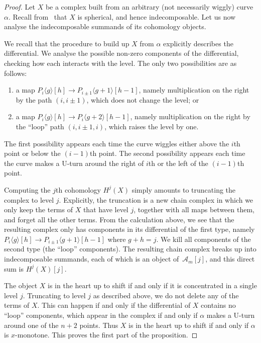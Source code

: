\documentclass{amsart}
\theoremstyle{definition}
\begin{document}
\begin{proof}
  Let \(X\) be a complex built from an arbitrary (not necessarily wiggly) curve \(\alpha\).
  Recall from~\cite{kho.sei:02} that \(X\) is spherical, and hence indecomposable.
  Let us now analyse the indecomposable summands of its cohomology objects.
  
  We recall that the procedure to build up \(X\) from \(\alpha\) explicitly describes the differential.
  We analyse the possible non-zero components of the differential, checking how each interacts with the level.
  The only two possibilities are as follows:
  \begin{enumerate}
  \item a map \(P_i\langle g \rangle[h] \to P_{i\pm1}\langle g+1 \rangle[h-1]\), namely multiplication on the right by the path \((i,i\pm1)\), which does not change the level; or
  \item a map \(P_i\langle g \rangle[h] \to P_{i}\langle g+2 \rangle[h-1]\), namely multiplication on the right by the ``loop'' path \((i,i\pm1, i)\), which raises the level by one.
  \end{enumerate}
  The first possibility appears each time the curve wiggles either above the \(i\)th point or below the \((i-1)\)th point.
  The second possibility appears each time the curve makes a U-turn around the right of \(i\)th or the left of the \((i-1)\)th point.

  Computing the \(j\)th cohomology \(H^j(X)\) simply amounts to truncating the complex to level \(j\).
  Explicitly, the truncation is a new chain complex in which we only keep the terms of \(X\) that have level \(j\), together with all maps between them, and forget all the other terms.
  From the calculation above, we see that the resulting complex only has components in its differential of the first type, namely \(P_i\langle g \rangle[h] \to P_{i\pm1}\langle g+1 \rangle[h-1]\) where \(g + h = j\).
  We kill all components of the second type (the ``loop'' components).
  The resulting chain complex breaks up into indecomposable summands, each of which is an object of~\(\mathcal{A}_m[j]\), and this direct sum is \(H^j(X)[j]\).
  
  The object \(X\) is in the heart up to shift if and only if it is concentrated in a single level \(j\).
  Truncating to level \(j\) as described above, we do not delete any of the terms of \(X\).
  This can happen if and only if the differential of \(X\) contains no ``loop'' components,
  which appear in the complex if and only if \(\alpha\) makes a U-turn around one of the \(n+2\) points.
  Thus \(X\) is in the heart up to shift if and only if \(\alpha\) is  \(x\)-monotone.
  This proves the first part of the proposition.


\end{proof}
\end{document}
